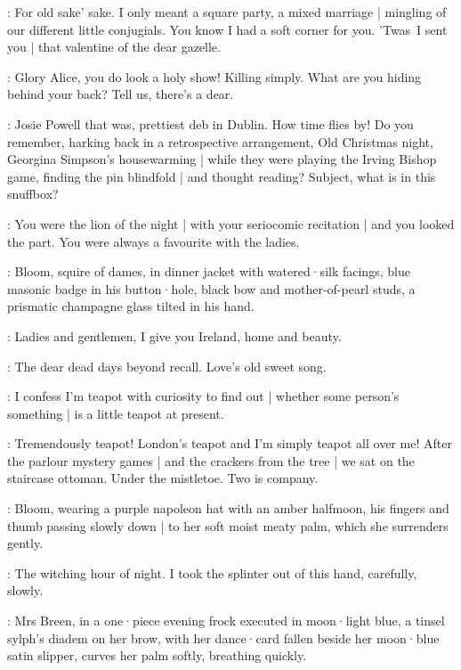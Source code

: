 \Bloom:
For old sake' sake.
I only meant a square party,
a mixed marriage |
mingling of our different little conjugials.
You know I had a soft corner for you.
'Twas~I sent you |
that valentine of the dear gazelle.

\MrsBreen:
Glory Alice,
you do look a holy show!
Killing simply.
What are you hiding behind your back?
Tell us,
there's a dear.

\Bloom:
Josie Powell that was,
prettiest deb in Dublin.
How time flies by!
Do you remember,
harking back in a retrospective arrangement,
Old Christmas night,
Georgina Simpson's housewarming |
while they were playing the Irving Bishop game,
finding the pin blindfold |
and thought reading?
Subject,
what is in this snuffbox?

\MrsBreen:
You were the lion of the night |
with your seriocomic recitation |
and you looked the part.
You were always a favourite with the ladies.

:
Bloom,
squire of dames,
in dinner jacket with watered·silk facings,
blue masonic badge in his button·hole,
black bow and mother-of-pearl studs,
a prismatic champagne glass tilted in his hand.

\Bloom:
Ladies and gentlemen,
I give you Ireland,
home and beauty.

\MrsBreen:
The dear dead days beyond recall.
Love's old sweet song.

\Bloom:
I confess I'm teapot with curiosity to find out |
whether some person's something |
is a little teapot at present.

\MrsBreen:
Tremendously teapot!
London's teapot and I'm simply teapot all over me!
After the parlour mystery games |
and the crackers from the tree |
we sat on the staircase ottoman.
Under the mistletoe.
Two is company.

:
Bloom,
wearing a purple napoleon hat with an amber halfmoon,
his fingers and thumb passing slowly down |
to her soft moist meaty palm,
which she surrenders gently.

\Bloom:
The witching hour of night.
I took the splinter out of this hand,
carefully,
slowly.

:
Mrs Breen,
in a one·piece evening frock executed in moon·light blue,
a tinsel sylph's diadem on her brow,
with her dance·card fallen beside her moon·blue satin slipper,
curves her palm softly,
breathing quickly.

